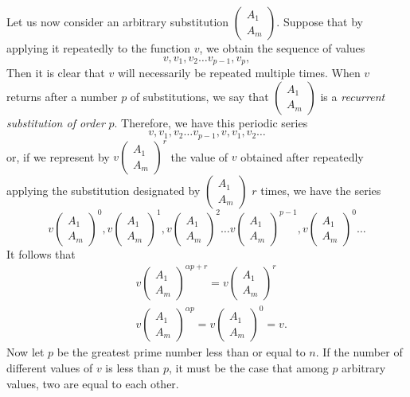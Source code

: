 \documentclass[oneside, 12 pt, leqno]{memoir}
\begin{document}
Let us now consider an arbitrary substitution \(\left(\begin{array}{c}A_1 \\ A_m\end{array}\right)\). Suppose that by applying it repeatedly to the function \(v\), we obtain the sequence of values
\[v, v_1, v_2 \dots v_{p-1}, v_p,\]
Then it is clear that \(v\) will necessarily be repeated multiple times. When \(v\) returns after a number \(p\) of substitutions, we say that \(\left(\begin{array}{l}A_1 \\ A_m\end{array}\right)\) is a \textit{recurrent substitution of order} \(p\). Therefore, we have this periodic series
\[v, v_1, v_2 \dots v_{p-1}, v, v_1, v_2 \dots\]
or, if we represent by \(v\left(\begin{array}{l}A_1 \\ A_m\end{array}\right)^r\) the value of \(v\) obtained after 
repeatedly applying the substitution designated by \(\left(\begin{array}{l}A_1 \\ A_m\end{array}\right)\) \(r\) times, we have the series
\[v\left(\begin{array}{l}A_1 \\A_m\end{array}\right)^0, v\left(\begin{array}{l}A_1 \\A_m\end{array}\right)^1, v\left(\begin{array}{l}A_1 \\A_m\end{array}\right)^2 \dots v\left(\begin{array}{l}A_1 \\A_m\end{array}\right)^{p-1}, v\left(\begin{array}{l}A_1 \\A_m\end{array}\right)^0 \dots\]
It follows that
\[\begin{aligned}
& v\left(\begin{array}{l}A_1 \\A_m\end{array}\right)^{\alpha p+r}=v\left(\begin{array}{l}A_1 \\A_m\end{array}\right)^r \\
& v\left(\begin{array}{l}A_1 \\A_m\end{array}\right)^{\alpha p}=v\left(\begin{array}{l}A_1 \\A_m\end{array}\right)^0=v.
\end{aligned}\]
Now let \(p\) be the greatest prime number less than or equal to \(n\).  If the number of different values of \(v\) is less than \(p\), it must be the case that among \(p\) arbitrary values, two are equal to each other.
\end{document}
